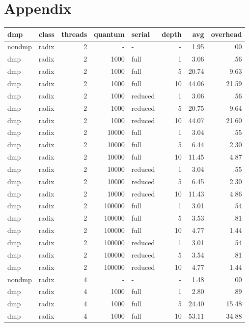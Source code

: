 \chapter{Appendix}
\label{Appendix}

\begin{center}
\begin{small}
\begin{longtable}{llrrlrrr}
\hline
dmp & class & threads & quantum & serial & depth & avg & overhead\\
\hline
nondmp & radix & 2 & - & - & - & 1.95 & .00\\
dmp & radix & 2 & 1000 & full & 1 & 3.06 & .56\\
dmp & radix & 2 & 1000 & full & 5 & 20.74 & 9.63\\
dmp & radix & 2 & 1000 & full & 10 & 44.06 & 21.59\\
dmp & radix & 2 & 1000 & reduced & 1 & 3.06 & .56\\
dmp & radix & 2 & 1000 & reduced & 5 & 20.75 & 9.64\\
dmp & radix & 2 & 1000 & reduced & 10 & 44.07 & 21.60\\
dmp & radix & 2 & 10000 & full & 1 & 3.04 & .55\\
dmp & radix & 2 & 10000 & full & 5 & 6.44 & 2.30\\
dmp & radix & 2 & 10000 & full & 10 & 11.45 & 4.87\\
dmp & radix & 2 & 10000 & reduced & 1 & 3.04 & .55\\
dmp & radix & 2 & 10000 & reduced & 5 & 6.45 & 2.30\\
dmp & radix & 2 & 10000 & reduced & 10 & 11.43 & 4.86\\
dmp & radix & 2 & 100000 & full & 1 & 3.01 & .54\\
dmp & radix & 2 & 100000 & full & 5 & 3.53 & .81\\
dmp & radix & 2 & 100000 & full & 10 & 4.77 & 1.44\\
dmp & radix & 2 & 100000 & reduced & 1 & 3.01 & .54\\
dmp & radix & 2 & 100000 & reduced & 5 & 3.54 & .81\\
dmp & radix & 2 & 100000 & reduced & 10 & 4.77 & 1.44\\
\hline
nondmp & radix & 4 & - & - & - & 1.48 & .00\\
dmp & radix & 4 & 1000 & full & 1 & 2.80 & .89\\
dmp & radix & 4 & 1000 & full & 5 & 24.40 & 15.48\\
dmp & radix & 4 & 1000 & full & 10 & 53.11 & 34.88\\

\end{longtable}
\end{small}
\end{center}
